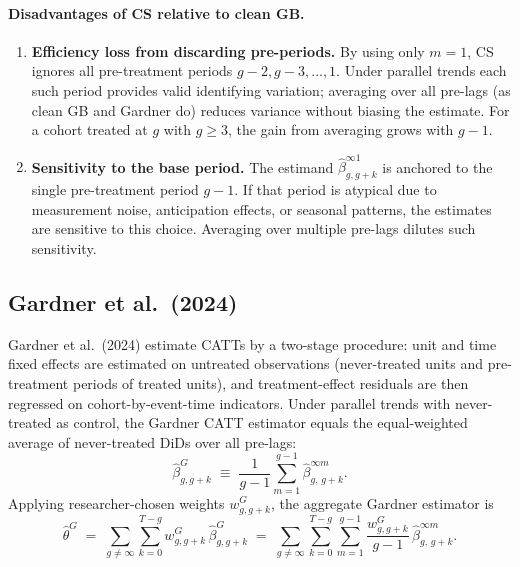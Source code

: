 \documentclass[12pt,letterpaper]{article}
\theoremstyle{remark}
\theoremstyle{definition}
\newcommand{\hbeta}{\hat{\beta}}
\begin{document}
\paragraph{Disadvantages of CS relative to clean GB.}
\begin{enumerate}
  \item \textbf{Efficiency loss from discarding pre-periods.} By using only
    $m=1$, CS ignores all pre-treatment periods $g-2,g-3,\ldots,1$. Under
    parallel trends each such period provides valid identifying variation;
    averaging over all pre-lags (as clean GB and Gardner do) reduces variance
    without biasing the estimate. For a cohort treated at $g$ with $g\geq3$,
    the gain from averaging grows with $g-1$.
  \item \textbf{Sensitivity to the base period.} The estimand
    $\hbeta^{\infty 1}_{g,g+k}$ is anchored to the single pre-treatment period
    $g-1$. If that period is atypical due to measurement noise, anticipation
    effects, or seasonal patterns, the estimates are sensitive to this choice.
    Averaging over multiple pre-lags dilutes such sensitivity.
\end{enumerate}

\subsection{Gardner et al.\ (2024)}
\label{sec:gardner}

Gardner et al.\ (2024) estimate CATTs by a two-stage procedure: unit and time
fixed effects are estimated on untreated observations (never-treated units and
pre-treatment periods of treated units), and treatment-effect residuals are
then regressed on cohort-by-event-time indicators. Under parallel trends with
never-treated as control, the Gardner CATT estimator equals the equal-weighted
average of never-treated DiDs over all pre-lags:
\begin{equation}
  \hbeta^{G}_{g,g+k}
  \;\equiv\;
  \frac{1}{g-1}\sum_{m=1}^{g-1}\hbeta^{\infty m}_{g,\,g+k}.
  \label{eq:gardner_catt}
\end{equation}
Applying researcher-chosen weights $w^G_{g,g+k}$, the aggregate Gardner
estimator is
\begin{equation}
  \hat{\theta}^{G}
  \;=\;
  \sum_{g\neq\infty}\sum_{k=0}^{T-g}
  w^G_{g,g+k}\,\hbeta^{G}_{g,g+k}
  \;=\;
  \sum_{g\neq\infty}\sum_{k=0}^{T-g}\sum_{m=1}^{g-1}
  \frac{w^G_{g,g+k}}{g-1}\,\hbeta^{\infty m}_{g,\,g+k}.
  \label{eq:gardner_agg}
\end{equation}
\end{document}
